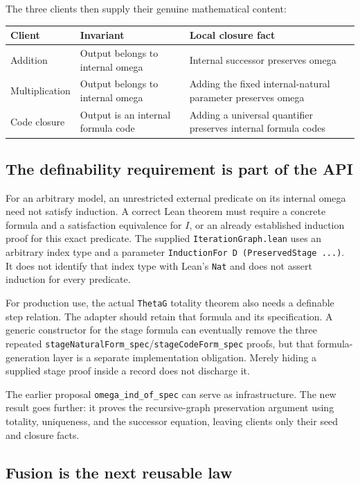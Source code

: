 \documentclass[11pt]{article}
\theoremstyle{remark}\newtheorem{remark}[theorem]{Remark}
\newcommand{\code}[1]{\nolinkurl{#1}}
\begin{document}
The three clients then supply their genuine mathematical content:

\begin{center}\small
\begin{tabular}{@{}P{32mm}P{50mm}P{67mm}@{}}
\toprule
Client & Invariant & Local closure fact\\
\midrule
Addition & Output belongs to internal omega & Internal successor preserves omega\\
Multiplication & Output belongs to internal omega & Adding the fixed internal-natural parameter preserves omega\\
Code closure & Output is an internal formula code & Adding a universal quantifier preserves internal formula codes\\
\bottomrule
\end{tabular}
\end{center}

\subsection{The definability requirement is part of the API}

For an arbitrary model, an unrestricted external predicate on its internal omega need not satisfy induction. A correct Lean theorem must require a concrete formula and a satisfaction equivalence for \(I\), or an already established induction proof for this exact predicate. The supplied \code{IterationGraph.lean} uses an arbitrary index type and a parameter \code{InductionFor D (PreservedStage ...)}. It does not identify that index type with Lean's \code{Nat} and does not assert induction for every predicate.

For production use, the actual \code{ThetaG} totality theorem also needs a definable step relation. The adapter should retain that formula and its specification. A generic constructor for the stage formula can eventually remove the three repeated \code{stageNaturalForm_spec}/\code{stageCodeForm_spec} proofs, but that formula-generation layer is a separate implementation obligation. Merely hiding a supplied stage proof inside a record does not discharge it.

The earlier proposal \code{omega_ind_of_spec} can serve as infrastructure. The new result goes further: it proves the recursive-graph preservation argument using totality, uniqueness, and the successor equation, leaving clients only their seed and closure facts.

\subsection{Fusion is the next reusable law}
\end{document}
